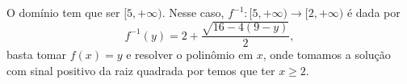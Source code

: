 O domínio tem que ser $[5,+\infty)$.
Nesse caso, $f^{-1}:[5,+\infty)\rightarrow[2,+\infty)$ é dada por
\[
	f^{-1}(y)=2+\frac{\sqrt{16-4(9-y)}}{2},
\]
basta tomar $f(x)=y$ e resolver o polinômio em $x$, onde tomamos a solução com sinal positivo da raiz quadrada por temos que ter $x\geq 2$.
